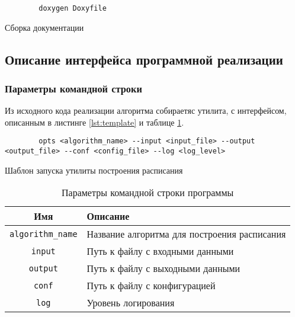 \begin{listing}[!htbp]
    \begin{verbatim}
        doxygen Doxyfile
    \end{verbatim}
    \caption{Сборка документации}
    \label{lst:docs}
\end{listing}


\subsection{Описание интерфейса программной реализации}
\subsubsection{Параметры командной строки}
Из исходного кода реализации алгоритма собираетяс утилита, с интерфейсом, описанным в листинге \ref{lst:template} и таблице \ref{tbl:command-line-parameters}. 
\begin{listing}[!htbp]
    \begin{verbatim}
        opts <algorithm_name> --input <input_file> --output <output_file> --conf <config_file> --log <log_level>
    \end{verbatim}
    \caption{Шаблон запуска утилиты построения расписания}
    \label{lst:template}
\end{listing}

\begin{table}[!htbp]
    \centering
    \begin{tabularx}{\textwidth}{|c|X|}
        \hline
        Имя                      & Описание                                     \\
        \hline
        \texttt{algorithm\_name} & Название алгоритма для построения расписания \\
        \hline
        \texttt{input}           & Путь к файлу с входными данными              \\
        \hline
        \texttt{output}          & Путь к файлу с выходными данными             \\
        \hline
        \texttt{conf}            & Путь к файлу с конфигурацией                 \\
        \hline
        \texttt{log}             & Уровень логирования                          \\
        \hline
    \end{tabularx}
    \caption{Параметры командной строки программы}
    \label{tbl:command-line-parameters}
\end{table}
